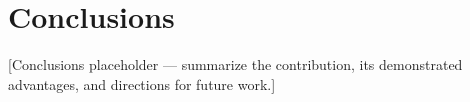 \section{Conclusions}
\label{sec:conclusions}
[Conclusions placeholder — summarize the contribution, its demonstrated advantages, and directions for future work.]
